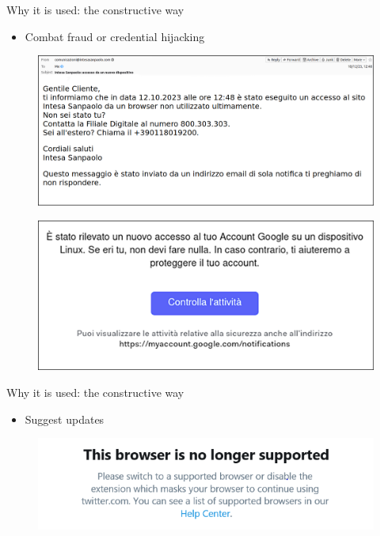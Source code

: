 \begin{frame}{Why it is used: the constructive way}
  \vspace{0.5cm}
  \begin{itemize}
    \item Combat fraud or credential hijacking
  \end{itemize}
  \vspace{0.25cm}
  \begin{figure}
    \centering
    \includegraphics[width=0.7\linewidth]{images/sanpaolo.png}
  \end{figure}
  \begin{figure}
    \centering
      \includegraphics[width=0.7\linewidth]{images/google.png}
  \end{figure}
\end{frame}

\begin{frame}{Why it is used: the constructive way}
  \vspace{-1.25cm}
  \begin{itemize}
    \item Suggest updates
  \end{itemize}
  \vspace{1cm}
  \begin{figure}
    \centering
    \includegraphics[width=0.9\linewidth]{images/update.png}
  \end{figure}
\end{frame}

